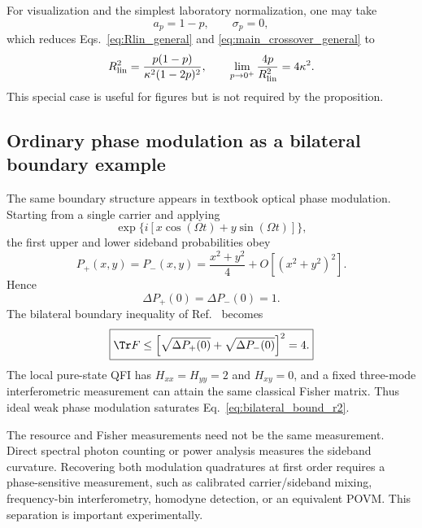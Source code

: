 For visualization and the simplest laboratory normalization, one may take
\begin{equation}
a_p=1-p,
\qquad \sigma_p=0,
\end{equation}
which reduces Eqs.~\eqref{eq:Rlin_general} and \eqref{eq:main_crossover_general} to
\begin{equation}
R_{\rm lin}^2=
\frac{p(1-p)}{\kappa^2(1-2p)^2},
\qquad
\lim_{p\to0^+}\frac{4p}{R_{\rm lin}^2}=4\kappa^2.
\end{equation}
This special case is useful for figures but is not required by the proposition.

\subsection{Ordinary phase modulation as a bilateral boundary example}

The same boundary structure appears in textbook optical phase modulation. Starting from a single carrier and applying
\begin{equation}
\exp\{i[x\cos(\Omega t)+y\sin(\Omega t)]\},
\end{equation}
the first upper and lower sideband probabilities obey
\begin{equation}
P_+(x,y)=P_-(x,y)=\frac{x^2+y^2}{4}+O[(x^2+y^2)^2].
\end{equation}
Hence
\begin{equation}
\Delta P_+(0)=\Delta P_-(0)=1.
\end{equation}
The bilateral boundary inequality of Ref.~\cite{CompanionTwoRegimes2026} becomes
\begin{equation}
\boxed{
\Tr F\le
\left[\sqrt{\Delta P_+(0)}+\sqrt{\Delta P_-(0)}\right]^2=4.}
\label{eq:bilateral_bound_r2}
\end{equation}
The local pure-state QFI has $H_{xx}=H_{yy}=2$ and $H_{xy}=0$, and a fixed three-mode interferometric measurement can attain the same classical Fisher matrix. Thus ideal weak phase modulation saturates Eq.~\eqref{eq:bilateral_bound_r2}.

The resource and Fisher measurements need not be the same measurement. Direct spectral photon counting or power analysis measures the sideband curvature. Recovering both modulation quadratures at first order requires a phase-sensitive measurement, such as calibrated carrier/sideband mixing, frequency-bin interferometry, homodyne detection, or an equivalent POVM. This separation is important experimentally.
